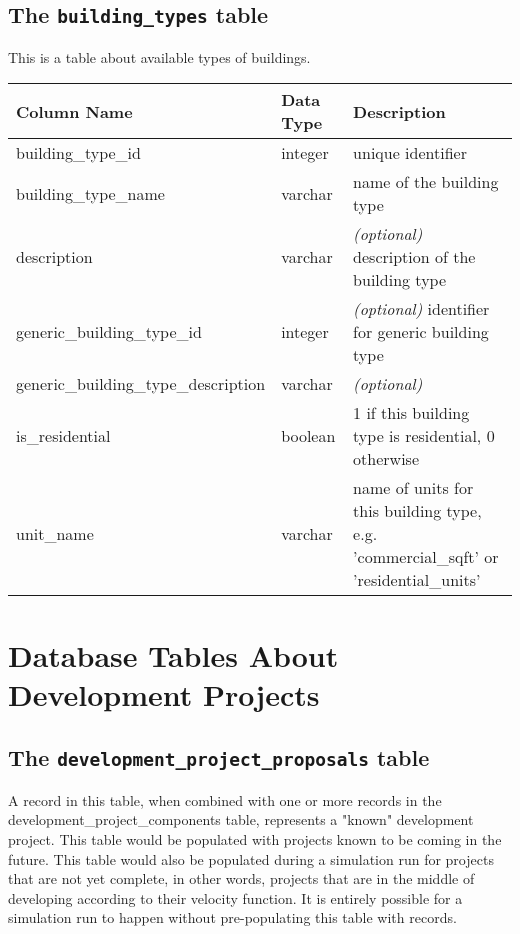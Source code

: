 \subsection{The {\tt building_types} table}
%
This is a table about available types of buildings.

\begin{tabular}{p{2in}lp{3.5in}}
\textbf{Column Name} & \textbf{Data Type} & \textbf{Description} \\
\hline
building\_type\_id & integer & unique identifier \\ \hline
building\_type\_name & varchar & name of the building type \\\hline
description & varchar & \emph{(optional)} description of the building type \\\hline
generic_building_type_id & integer & \emph{(optional)} identifier for generic building type \\\hline
generic_building_type_description & varchar & \emph{(optional)}\\\hline
is_residential & boolean & 1 if this building type is residential, 0 otherwise \\\hline
unit_name & varchar & name of units for this building type, e.g. 'commercial_sqft' or 'residential_units' \\\hline
\end{tabular}


\section{Database Tables About Development Projects}

\subsection{The {\tt development\_project\_proposals} table}
\label{sec:db-tables-development-project-proposals}

A record in this table, when combined with one or more records in the development\_project\_components table, represents a "known" development project. 
This table would be populated with projects known to be coming in the future. 
This table would also be populated during a simulation run for projects that are not yet complete, in other words, 
projects that are in the middle of developing according to their velocity function. 
It is entirely possible for a simulation run to happen without pre-populating this table with records.

